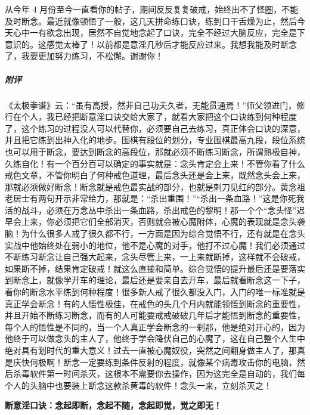 \begin{case}
    从今年 4 月份至今一直看你的帖子，期间反反复复破戒，始终出不了怪圈，不能及时断念。最近就像顿悟了一般，这几天拼命练口诀，练到口干舌燥为止，然后今天心中一有欲念出现，居然不自觉地念起了口诀，完全不经过大脑反应，完全是下意识的。这感觉太棒了！以前都是意淫几秒后才能反应过来。我想我能及时断念了，我要更加努力练习，不松懈。谢谢你！
    \subparagraph{附评} 《太极拳谱》云：“虽有高授，然非自己功夫久者，无能贯通焉！”师父领进门，修行在个人，我已经把断意淫口诀交给大家了，就看大家把这个口诀练到何种程度了，这个练习的过程没人可以代替你，必须要自己去练习，真正体会口诀的深意，并且把它练到出神入化的地步。围棋有段位的划分，专业围棋最高九段，段位系统也可以用于断念，要达到断念的高段位，那就必须不断练习断念，所谓熟极自神，久练自化！有一个百分百可以确定的事实就是：念头肯定会上来！不管你看了什么戒色文章，不管你明白了何种戒色道理，最后念头还是会上来，既然念头会上来，那就必须做好断念！断念就是戒色最实战的部分，也就是刺刀见红的部分。黄念祖老居士有两句开示非常给力，那就是：“杀出重围！”“杀出一条血路！”这是你死我活的战斗，必须在万念丛中杀出一条血路，杀出戒色的黎明！那一个个“念头怪”迟早会上来，你必须把它们全部消灭，否则就会被心魔附体，心魔的表现就是念头袭脑！为什么很多人戒了很久都不行，一方面是因为综合觉悟不行，还有就是在念头实战中他始终处在弱小的地位，他不是心魔的对手，他打不过心魔！我们必须通过不断练习断念让自己强大起来，念头尽管上来，一上来就断掉，这样就不会破戒，如果断不掉，结果肯定破戒！就这么直接和简单。综合觉悟的提升最后还是要落实到断念上，就像学开车的理论，最后还是要亲自去开车，最后就看断念这一下子，看你的断念水平练到何种程度！很多新人戒了很久都没入门，入门的唯一标准就是真正学会断念！有的人悟性极佳，在戒色的头几个月内就能领悟到断念的重要性，并且开始不断练习断念，而有的人可能要戒戒破破几年后才能悟到断念的重要性，每个人的悟性是不同的，当一个人真正学会断念的一刹那，他是绝对开心的，因为他终于可以做念头的主人了，他终于学会降伏自己的心魔了，这在自己整个人生中绝对具有划时代的重大意义！过去一直被心魔奴役，突然之间翻身做主人了，那真是庆快何极啊！断念一定要练到条件反射的程度，就像某个病毒攻击你的电脑，然后杀毒软件第一时间杀灭，这根本不需要你去操作，因为这完全是自动的，我们每个人的头脑中也要装上断念这款杀黄毒的软件！念头一来，立刻杀灭之！

    \bf 断意淫口诀：念起即断，念起不随，念起即觉，觉之即无！
\end{case}

